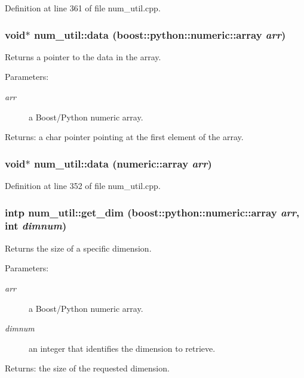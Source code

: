 Definition at line 361 of file num\_\-util.cpp.
\subsubsection{\setlength{\rightskip}{0pt plus 5cm}void$\ast$ num\_\-util::data (boost::python::numeric::array {\em arr})}\label{namespacenum__util_a71}


Returns a pointer to the data in the array. \begin{Desc}
\item[Parameters:]
\begin{description}
\item[{\em arr}]a Boost/Python numeric array. \end{description}
\end{Desc}
\begin{Desc}
\item[Returns:]a char pointer pointing at the first element of the array.\end{Desc}
\subsubsection{\setlength{\rightskip}{0pt plus 5cm}void$\ast$ num\_\-util::data (numeric::array {\em arr})}\label{namespacenum__util_a48}




Definition at line 352 of file num\_\-util.cpp.
\subsubsection{\setlength{\rightskip}{0pt plus 5cm}intp num\_\-util::get\_\-dim (boost::python::numeric::array {\em arr}, int {\em dimnum})}\label{namespacenum__util_a43}


Returns the size of a specific dimension. \begin{Desc}
\item[Parameters:]
\begin{description}
\item[{\em arr}]a Boost/Python numeric array. \item[{\em dimnum}]an integer that identifies the dimension to retrieve. \end{description}
\end{Desc}
\begin{Desc}
\item[Returns:]the size of the requested dimension.\end{Desc}


